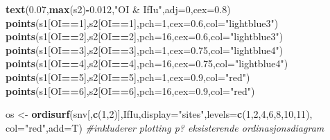 \documentclass[]{article}
\newenvironment{Shaded}{\begin{snugshade}}{\end{snugshade}}
\newcommand{\CommentTok}[1]{\textcolor[rgb]{0.56,0.35,0.01}{\textit{#1}}}
\newcommand{\DataTypeTok}[1]{\textcolor[rgb]{0.13,0.29,0.53}{#1}}
\newcommand{\DecValTok}[1]{\textcolor[rgb]{0.00,0.00,0.81}{#1}}
\newcommand{\FloatTok}[1]{\textcolor[rgb]{0.00,0.00,0.81}{#1}}
\newcommand{\KeywordTok}[1]{\textcolor[rgb]{0.13,0.29,0.53}{\textbf{#1}}}
\newcommand{\NormalTok}[1]{#1}
\newcommand{\OperatorTok}[1]{\textcolor[rgb]{0.81,0.36,0.00}{\textbf{#1}}}
\newcommand{\StringTok}[1]{\textcolor[rgb]{0.31,0.60,0.02}{#1}}
\begin{document}
\begin{Shaded}
\begin{Highlighting}[]
\KeywordTok{text}\NormalTok{(}\FloatTok{0.07}\NormalTok{,}\KeywordTok{max}\NormalTok{(s2)}\OperatorTok{-}\FloatTok{0.012}\NormalTok{,}\StringTok{"OI & IfIu"}\NormalTok{,}\DataTypeTok{adj=}\DecValTok{0}\NormalTok{,}\DataTypeTok{cex=}\FloatTok{0.8}\NormalTok{)}
\KeywordTok{points}\NormalTok{(s1[OI}\OperatorTok{==}\DecValTok{1}\NormalTok{],s2[OI}\OperatorTok{==}\DecValTok{1}\NormalTok{],}\DataTypeTok{pch=}\DecValTok{1}\NormalTok{,}\DataTypeTok{cex=}\FloatTok{0.6}\NormalTok{,}\DataTypeTok{col=}\StringTok{"lightblue3"}\NormalTok{)}
\KeywordTok{points}\NormalTok{(s1[OI}\OperatorTok{==}\DecValTok{2}\NormalTok{],s2[OI}\OperatorTok{==}\DecValTok{2}\NormalTok{],}\DataTypeTok{pch=}\DecValTok{16}\NormalTok{,}\DataTypeTok{cex=}\FloatTok{0.6}\NormalTok{,}\DataTypeTok{col=}\StringTok{"lightblue3"}\NormalTok{)}
\KeywordTok{points}\NormalTok{(s1[OI}\OperatorTok{==}\DecValTok{3}\NormalTok{],s2[OI}\OperatorTok{==}\DecValTok{3}\NormalTok{],}\DataTypeTok{pch=}\DecValTok{1}\NormalTok{,}\DataTypeTok{cex=}\FloatTok{0.75}\NormalTok{,}\DataTypeTok{col=}\StringTok{"lightblue4"}\NormalTok{)}
\KeywordTok{points}\NormalTok{(s1[OI}\OperatorTok{==}\DecValTok{4}\NormalTok{],s2[OI}\OperatorTok{==}\DecValTok{4}\NormalTok{],}\DataTypeTok{pch=}\DecValTok{16}\NormalTok{,}\DataTypeTok{cex=}\FloatTok{0.75}\NormalTok{,}\DataTypeTok{col=}\StringTok{"lightblue4"}\NormalTok{)}
\KeywordTok{points}\NormalTok{(s1[OI}\OperatorTok{==}\DecValTok{5}\NormalTok{],s2[OI}\OperatorTok{==}\DecValTok{5}\NormalTok{],}\DataTypeTok{pch=}\DecValTok{1}\NormalTok{,}\DataTypeTok{cex=}\FloatTok{0.9}\NormalTok{,}\DataTypeTok{col=}\StringTok{"red"}\NormalTok{)}
\KeywordTok{points}\NormalTok{(s1[OI}\OperatorTok{==}\DecValTok{6}\NormalTok{],s2[OI}\OperatorTok{==}\DecValTok{6}\NormalTok{],}\DataTypeTok{pch=}\DecValTok{16}\NormalTok{,}\DataTypeTok{cex=}\FloatTok{0.9}\NormalTok{,}\DataTypeTok{col=}\StringTok{"red"}\NormalTok{)}

\NormalTok{os <-}\StringTok{ }\KeywordTok{ordisurf}\NormalTok{(snv[,}\KeywordTok{c}\NormalTok{(}\DecValTok{1}\NormalTok{,}\DecValTok{2}\NormalTok{)],IfIu,}\DataTypeTok{display=}\StringTok{"sites"}\NormalTok{,}\DataTypeTok{levels=}\KeywordTok{c}\NormalTok{(}\DecValTok{1}\NormalTok{,}\DecValTok{2}\NormalTok{,}\DecValTok{4}\NormalTok{,}\DecValTok{6}\NormalTok{,}\DecValTok{8}\NormalTok{,}\DecValTok{10}\NormalTok{,}\DecValTok{11}\NormalTok{), }\DataTypeTok{col=}\StringTok{"red"}\NormalTok{,}\DataTypeTok{add=}\NormalTok{T) }\CommentTok{#inkluderer plotting p? eksisterende ordinasjonsdiagram}
\end{Highlighting}
\end{Shaded}
\end{document}
